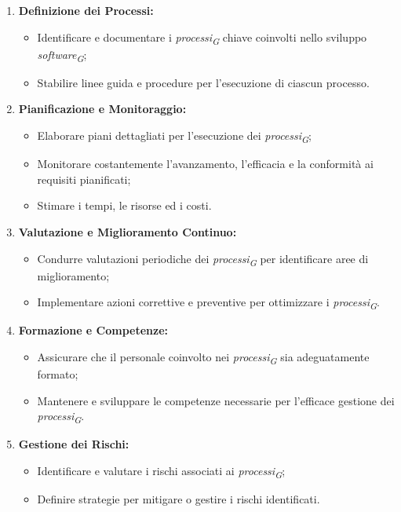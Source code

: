\begin{enumerate}
    \item \textbf{Definizione dei Processi:}
      \begin{itemize}
        \item Identificare e documentare i \textit{processi}\textsubscript{\textit{G}} chiave coinvolti nello sviluppo \textit{software}\textsubscript{\textit{G}};
        \item Stabilire linee guida e procedure per l'esecuzione di ciascun processo.
      \end{itemize}
  
    \item \textbf{Pianificazione e Monitoraggio:}
      \begin{itemize}
        \item Elaborare piani dettagliati per l'esecuzione dei \textit{processi}\textsubscript{\textit{G}};
        \item Monitorare costantemente l'avanzamento, l'efficacia e la conformità ai requisiti pianificati;
        \item Stimare i tempi, le risorse ed i costi.
      \end{itemize}
  
    \item \textbf{Valutazione e Miglioramento Continuo:}
      \begin{itemize}
        \item Condurre valutazioni periodiche dei \textit{processi}\textsubscript{\textit{G}} per identificare aree di miglioramento;
        \item Implementare azioni correttive e preventive per ottimizzare i \textit{processi}\textsubscript{\textit{G}}.
      \end{itemize}
  
    \item \textbf{Formazione e Competenze:}
      \begin{itemize}
        \item Assicurare che il personale coinvolto nei \textit{processi}\textsubscript{\textit{G}} sia adeguatamente formato;
        \item Mantenere e sviluppare le competenze necessarie per l'efficace gestione dei \textit{processi}\textsubscript{\textit{G}}.
      \end{itemize}
  
    \item \textbf{Gestione dei Rischi:}
      \begin{itemize}
        \item Identificare e valutare i rischi associati ai \textit{processi}\textsubscript{\textit{G}};
        \item Definire strategie per mitigare o gestire i rischi identificati.
      \end{itemize}
  \end{enumerate}
  
